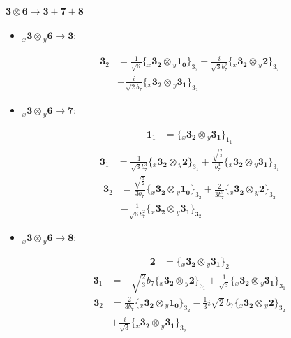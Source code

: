 \documentclass[english]{article}
\newcommand{\cgEqFontsize}{\large}
\newcommand{\rep}[1]{\mathbf{#1}}
\newcommand{\repx}[2]{{}_{#2}\mathbf{#1}}
\newcommand{\tsprod}[2]{\rep{#1}\otimes\rep{#2}}
\newcommand{\tsprodx}[2]{\repx{#1}{x}\otimes\repx{#2}{y}}
\newcommand{\subcgs}[3]{\big\{ \tsprodx{#1}{#2}\big\}^{}_{#3}}
\newcommand{\bfl}{\begin{fleqn}[25pt]}
\newcommand{\efl}{\end{fleqn}}
\begin{document}
\paragraph*{\cgEqFontsize $\tsprod{3}{6}\to\rep{\bar{3}}+\rep{7}+\rep{8}$}
\begin{itemize}
\item $\tsprodx{3}{6}\to\rep{\bar{3}}$:
\bfl
\begin{align*}
\rep{3}_{2} & = \frac{1}{\sqrt{6}}\subcgs{3_{2}}{1_{0}}{3_{2}}-\frac{i}{\sqrt{3} b_7^2}\subcgs{3_{2}}{2}{3_{2}} \\ 
 & +\frac{i}{\sqrt{2} b_7}\subcgs{3_{2}}{3_{1}}{3_{2}}
\end{align*}
\efl
\item $\tsprodx{3}{6}\to\rep{7}$:
\bfl
\begin{align*}
\rep{1}_{1} & = \subcgs{3_{2}}{3_{1}}{1_{1}}
\end{align*}
\begin{align*}
\rep{3}_{1} & = \frac{1}{\sqrt{3} b_7^3}\subcgs{3_{2}}{2}{3_{1}}+\frac{\sqrt{\frac{2}{3}}}{b_7^4}\subcgs{3_{2}}{3_{1}}{3_{1}}
\end{align*}
\begin{align*}
\rep{3}_{2} & = \frac{\sqrt{\frac{7}{2}}}{3 b_7}\subcgs{3_{2}}{1_{0}}{3_{2}}+\frac{2}{3 b_7^5}\subcgs{3_{2}}{2}{3_{2}} \\ 
 & -\frac{1}{\sqrt{6} b_7^2}\subcgs{3_{2}}{3_{1}}{3_{2}}
\end{align*}
\efl
\item $\tsprodx{3}{6}\to\rep{8}$:
\bfl
\begin{align*}
\rep{2} & = \subcgs{3_{2}}{3_{1}}{2}
\end{align*}
\begin{align*}
\rep{3}_{1} & = -\sqrt{\frac{2}{3}} b_7\subcgs{3_{2}}{2}{3_{1}}+\frac{1}{\sqrt{3}}\subcgs{3_{2}}{3_{1}}{3_{1}}
\end{align*}
\begin{align*}
\rep{3}_{2} & = \frac{2}{3 b_7}\subcgs{3_{2}}{1_{0}}{3_{2}}-\frac{1}{3} i \sqrt{2} b_7\subcgs{3_{2}}{2}{3_{2}} \\ 
 & +\frac{i}{\sqrt{3}}\subcgs{3_{2}}{3_{1}}{3_{2}}
\end{align*}
\efl
\end{itemize}
\end{document}
